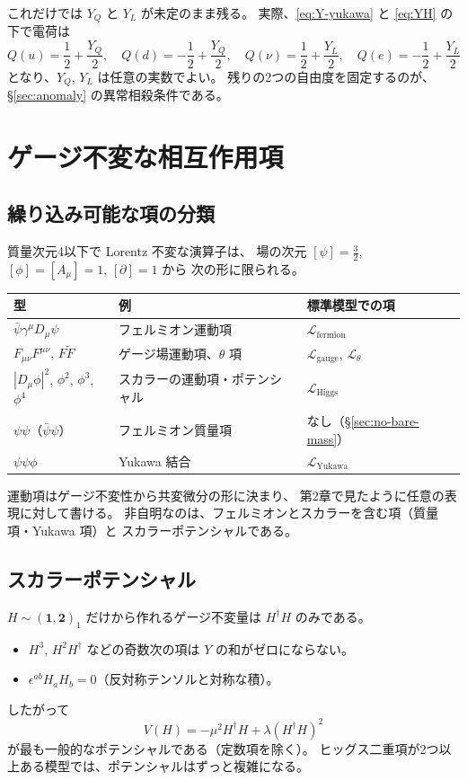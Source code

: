 \documentclass[uplatex,dvipdfmx,a4paper,11pt,openany]{jsbook}
\numberwithin{equation}{chapter}
\theoremstyle{definition}
\theoremstyle{plain}
\theoremstyle{remark}
\newcommand{\Lag}{\mathcal{L}}
\begin{document}
これだけでは $Y_Q$ と $Y_L$ が未定のまま残る。
実際、\eqref{eq:Y-yukawa} と \eqref{eq:YH} の下で電荷は
\begin{equation}
Q(u)=\frac12+\frac{Y_Q}{2},\quad
Q(d)=-\frac12+\frac{Y_Q}{2},\quad
Q(\nu)=\frac12+\frac{Y_L}{2},\quad
Q(e)=-\frac12+\frac{Y_L}{2}
\end{equation}
となり、$Y_Q$, $Y_L$ は任意の実数でよい。
残りの2つの自由度を固定するのが、\S\ref{sec:anomaly} の異常相殺条件である。
\section{ゲージ不変な相互作用項}
\label{sec:invariant-terms}
\subsection{繰り込み可能な項の分類}
質量次元4以下で Lorentz 不変な演算子は、
場の次元 $[\psi]=\frac32$, $[\phi]=[A_\mu]=1$, $[\partial]=1$ から
次の形に限られる。
\begin{center}
\renewcommand{\arraystretch}{1.3}
\begin{tabular}{lll}
\toprule
型 & 例 & 標準模型での項\\
\midrule
$\bar\psi\gamma^\mu D_\mu\psi$ & フェルミオン運動項 & $\Lag_{\mathrm{fermion}}$\\
$F_{\mu\nu}F^{\mu\nu}$, $F\tilde F$ & ゲージ場運動項、$\theta$ 項 & $\Lag_{\mathrm{gauge}}$, $\Lag_\theta$\\
$|D_\mu\phi|^2$, $\phi^2$, $\phi^3$, $\phi^4$ & スカラーの運動項・ポテンシャル & $\Lag_{\mathrm{Higgs}}$\\
$\psi\psi$（$\bar\psi\psi$） & フェルミオン質量項 & なし（\S\ref{sec:no-bare-mass}）\\
$\psi\psi\phi$ & Yukawa 結合 & $\Lag_{\mathrm{Yukawa}}$\\
\bottomrule
\end{tabular}
\end{center}
運動項はゲージ不変性から共変微分の形に決まり、
第2章で見たように任意の表現に対して書ける。
非自明なのは、フェルミオンとスカラーを含む項（質量項・Yukawa 項）と
スカラーポテンシャルである。
\subsection{スカラーポテンシャル}
$H\sim(\mathbf1,\mathbf2)_1$ だけから作れるゲージ不変量は $H^\dagger H$ のみである。
\begin{itemize}
    \item $H^3$, $H^2H^\dagger$ などの奇数次の項は $Y$ の和がゼロにならない。
    \item $\epsilon^{ab}H_aH_b=0$（反対称テンソルと対称な積）。
\end{itemize}
したがって
\begin{equation}
V(H)=-\mu^2H^\dagger H+\lambda(H^\dagger H)^2
\end{equation}
が最も一般的なポテンシャルである（定数項を除く）。
ヒッグス二重項が2つ以上ある模型では、ポテンシャルはずっと複雑になる。
\end{document}
